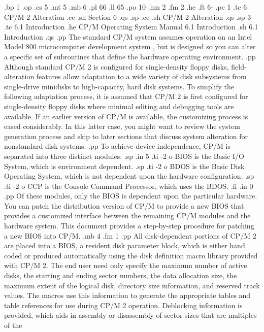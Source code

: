 .bp 1
.op
.cs 5
.mt 5
.mb 6
.pl 66
.ll 65
.po 10
.hm 2
.fm 2
.he
.ft                                6-%
.pc 1
.tc 6  CP/M 2 Alteration
.ce
.sh
Section 6
.qs
.sp
.ce
.sh
CP/M 2 Alteration
.qs
.sp 3
.tc    6.1  Introduction
.he CP/M Operating System Manual                    6.1  Introduction
.sh
6.1  Introduction
.qs
.pp
The standard CP/M system assumes operation on an Intel Model 
800 microcomputer development system , but is designed so you can alter a
specific set of subroutines that define the hardware operating 
environment.
.pp
Although standard CP/M 2 is configured for single-density floppy 
disks, field-alteration features allow adaptation to a wide 
variety of disk subsystems from single-drive minidisks to 
high-capacity, hard disk systems.  To simplify the following 
adaptation process, it is assumed that CP/M 2 is first 
configured for single-density floppy disks where minimal editing 
and debugging tools are available.  If an earlier version of CP/M 
is available, the customizing process is eased considerably.  In 
this latter case, you might want to review the system 
generation process and skip to later sections that discuss system 
alteration for nonstandard disk systems.
.pp
To achieve device independence, CP/M is separated into three 
distinct modules:
.sp
.in 5
.ti -2
o BIOS is the Basic I/O System, which is environment dependent.
.sp
.ti -2
o BDOS is the Basic Disk Operating System, which is not dependent upon the
hardware configuration.
.sp
.ti -2
o CCP is the Console Command Processor, which uses the BDOS.
.fi
.in 0
.pp
Of these modules, only the BIOS is dependent upon the particular 
hardware.  You can patch the distribution version 
of CP/M to provide a new BIOS that provides a customized 
interface between the remaining CP/M modules and the 
hardware system.  This document provides a step-by-step 
procedure for patching a new BIOS into CP/M.
.mb 4
.fm 1
.pp
All disk-dependent portions of CP/M 2 are placed into a BIOS, a 
resident disk parameter block, which is either hand coded or 
produced automatically using the disk definition macro library 
provided with CP/M 2.  The end user need only specify the maximum 
number of active disks, the starting and ending sector numbers, 
the data allocation size, the maximum extent of the logical disk, 
directory size information, and reserved track values.
The macros use this information to generate 
the appropriate tables and table references for use during CP/M 2 
operation.  Deblocking information is provided, which aids in 
assembly or disassembly of sector sizes that are multiples of the 
